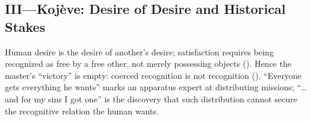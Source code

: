 \subsection*{III—Koj\`eve: Desire of Desire and Historical Stakes}
\label{ssec:iii-kojeve}
Human desire is the desire of another’s desire; satisfaction requires being recognized as free by a free other, not merely possessing objects (\parencite[pp.~6, 27--34]{KojeveIRH1980}). Hence the master’s “victory” is empty: coerced recognition is not recognition (\parencite[pp.~158--164]{KojeveIRH1980}). “Everyone gets everything he wants” marks an apparatus expert at distributing missions; “…and for my sins I got one” is the discovery that such distribution cannot secure the recognitive relation the human wants.
